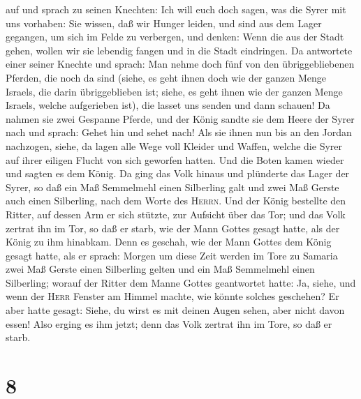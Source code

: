 auf und sprach zu seinen Knechten: Ich will euch doch sagen, was die
Syrer mit uns vorhaben: Sie wissen, daß wir Hunger leiden, und sind aus
dem Lager gegangen, um sich im Felde zu verbergen, und denken: Wenn die
aus der Stadt gehen, wollen wir sie lebendig fangen und in die Stadt
eindringen.  Da antwortete einer seiner Knechte und
sprach: Man nehme doch fünf von den übriggebliebenen Pferden, die noch
da sind (siehe, es geht ihnen doch wie der ganzen Menge Israels, die
darin übriggeblieben ist; siehe, es geht ihnen wie der ganzen Menge
Israels, welche aufgerieben ist), die lasset uns senden und dann
schauen!  Da nahmen sie zwei Gespanne Pferde, und der
König sandte sie dem Heere der Syrer nach und sprach: Gehet hin und
sehet nach!  Als sie ihnen nun bis an den Jordan
nachzogen, siehe, da lagen alle Wege voll Kleider und Waffen, welche die
Syrer auf ihrer eiligen Flucht von sich geworfen hatten. Und die Boten
kamen wieder und sagten es dem König.  Da ging das Volk
hinaus und plünderte das Lager der Syrer, so daß ein Maß Semmelmehl
einen Silberling galt und zwei Maß Gerste auch einen Silberling, nach
dem Worte des \textsc{Herrn}.  Und der König bestellte
den Ritter, auf dessen Arm er sich stützte, zur Aufsicht über das Tor;
und das Volk zertrat ihn im Tor, so daß er starb, wie der Mann Gottes
gesagt hatte, als der König zu ihm hinabkam.  Denn es
geschah, wie der Mann Gottes dem König gesagt hatte, als er sprach:
Morgen um diese Zeit werden im Tore zu Samaria zwei Maß Gerste einen
Silberling gelten und ein Maß Semmelmehl einen Silberling;
 worauf der Ritter dem Manne Gottes geantwortet hatte:
Ja, siehe, und wenn der \textsc{Herr} Fenster am Himmel machte, wie
könnte solches geschehen? Er aber hatte gesagt: Siehe, du wirst es mit
deinen Augen sehen, aber nicht davon essen!  Also erging
es ihm jetzt; denn das Volk zertrat ihn im Tore, so daß er starb.

\hypertarget{section-7}{%
\section{8}\label{section-7}}


